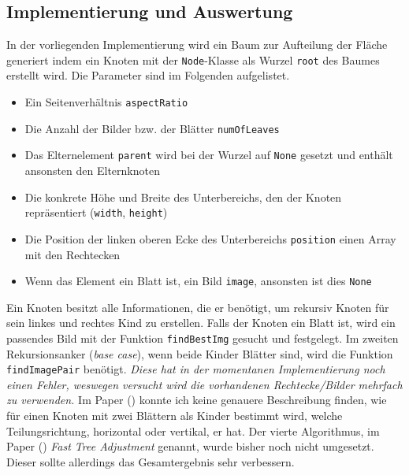\documentclass[12pt, ngerman, utf8]{article}
\begin{document}
\subsection{Implementierung und Auswertung}
In der vorliegenden Implementierung wird ein Baum zur Aufteilung der Fläche generiert indem ein Knoten mit der \texttt{Node}-Klasse als Wurzel \texttt{root} des Baumes erstellt wird. Die Parameter sind im Folgenden aufgelistet.
\begin{itemize}
\item Ein Seitenverhältnis \texttt{aspectRatio}
\item Die Anzahl der Bilder bzw. der Blätter \texttt{numOfLeaves}
\item Das Elternelement \texttt{parent} wird bei der Wurzel auf \texttt{None} gesetzt und enthält ansonsten den Elternknoten
\item Die konkrete Höhe und Breite des Unterbereichs, den der Knoten repräsentiert (\texttt{width}, \texttt{height})
\item Die Position der linken oberen Ecke des Unterbereichs \texttt{position}
einen Array mit den Rechtecken
\item Wenn das Element ein Blatt ist, ein Bild \texttt{image}, ansonsten ist dies \texttt{None}
\end{itemize}
Ein Knoten besitzt alle Informationen, die er benötigt, um rekursiv Knoten für sein linkes und rechtes Kind zu erstellen. Falls der Knoten ein Blatt ist, wird ein passendes Bild mit der Funktion \texttt{findBestImg} gesucht und festgelegt. Im zweiten Rekursionsanker (\emph{base case}), wenn beide Kinder Blätter sind, wird die Funktion \texttt{findImagePair} benötigt. \emph{Diese hat in der momentanen Implementierung noch einen Fehler, weswegen versucht wird die vorhandenen Rechtecke/Bilder mehrfach zu verwenden.} Im Paper (\cite{picwall}) konnte ich keine genauere Beschreibung finden, wie für einen Knoten mit zwei Blättern als Kinder bestimmt wird, welche Teilungsrichtung, horizontal oder vertikal, er hat. Der vierte Algorithmus, im Paper (\cite{picwall}) \emph{Fast Tree Adjustment} genannt, wurde bisher noch nicht umgesetzt. Dieser sollte allerdings das Gesamtergebnis sehr verbessern. 
\end{document}
